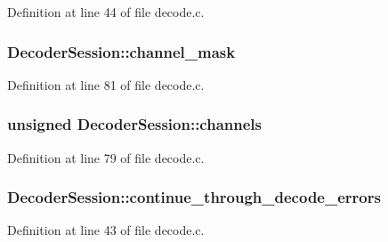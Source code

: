 Definition at line 44 of file decode.\+c.

\subsubsection[{\texorpdfstring{channel\+\_\+mask}{channel_mask}}]{ Decoder\+Session\+::channel\+\_\+mask}\hypertarget{struct_decoder_session_a5fbdf1cdf09d83b3e9b9496c38816ac0}{}\label{struct_decoder_session_a5fbdf1cdf09d83b3e9b9496c38816ac0}


Definition at line 81 of file decode.\+c.

\subsubsection[{\texorpdfstring{channels}{channels}}]{\setlength{\rightskip}{0pt plus 5cm}unsigned Decoder\+Session\+::channels}\hypertarget{struct_decoder_session_abf085096b41983eff38f0b73befb37e0}{}\label{struct_decoder_session_abf085096b41983eff38f0b73befb37e0}


Definition at line 79 of file decode.\+c.

\subsubsection[{\texorpdfstring{continue\+\_\+through\+\_\+decode\+\_\+errors}{continue_through_decode_errors}}]{ Decoder\+Session\+::continue\+\_\+through\+\_\+decode\+\_\+errors}\hypertarget{struct_decoder_session_a06e87dfaddbc0119c3f88748b70b1621}{}\label{struct_decoder_session_a06e87dfaddbc0119c3f88748b70b1621}


Definition at line 43 of file decode.\+c.

